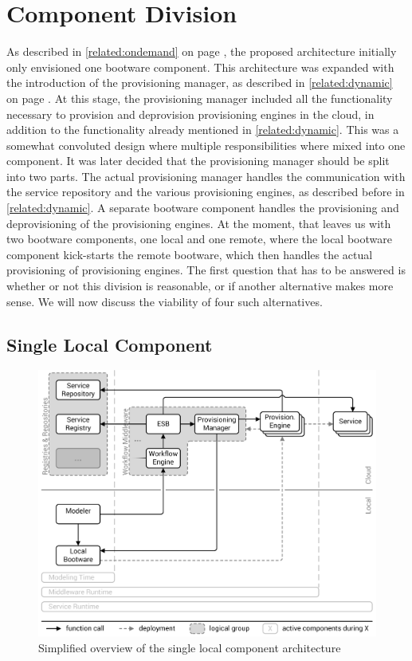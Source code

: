 \section{Component Division}
\label{design:division}

As described in \autoref{related:ondemand} on page \pageref{related:ondemand}, the proposed architecture initially only envisioned one bootware component.
This architecture was expanded with the introduction of the provisioning manager, as described in \autoref{related:dynamic} on page \pageref{related:dynamic}.
At this stage, the provisioning manager included all the functionality necessary to provision and deprovision provisioning engines in the cloud, in addition to the functionality already mentioned in \autoref{related:dynamic}.
This was a somewhat convoluted design where multiple responsibilities where mixed into one component.
It was later decided that the provisioning manager should be split into two parts.
The actual provisioning manager handles the communication with the service repository and the various provisioning engines, as described before in \autoref{related:dynamic}.
A separate bootware component handles the provisioning and deprovisioning of the provisioning engines.
At the moment, that leaves us with two bootware components, one local and one remote, where the local bootware component kick-starts the remote bootware, which then handles the actual provisioning of provisioning engines.
The first question that has to be answered is whether or not this division is reasonable, or if another alternative makes more sense.
We will now discuss the viability of four such alternatives.

\subsection{Single Local Component}

\begin{figure}[!htbp]
	\centering
	\includegraphics[resolution=600]{design/assets/simple_local}
	\caption{Simplified overview of the single local component architecture}
	\label{image:single_local}
\end{figure}

